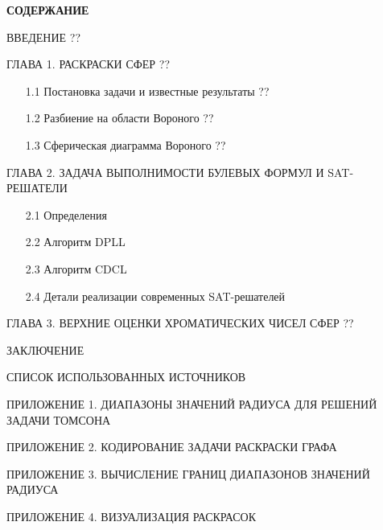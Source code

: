 
\newpage

\thispagestyle{empty} %

\begin{center}
\textbf{СОДЕРЖАНИЕ}
\end{center}
\vspace{1.5mm}

\begin{description}

\item{ВВЕДЕНИЕ} \dotfill ??

\item{ГЛАВА 1.} РАСКРАСКИ СФЕР \dotfill ??
\begin{enumerate}
\item[1.1] Постановка задачи  и известные результаты \dotfill ??
\item[1.2] Разбиение на области Вороного \dotfill ??
\item[1.3] Сферическая диаграмма Вороного \dotfill ??
\end{enumerate}

\item{ГЛАВА 2.} ЗАДАЧА ВЫПОЛНИМОСТИ БУЛЕВЫХ ФОРМУЛ И SAT-РЕШАТЕЛИ \dotfill \pageref{chapters:2}
\begin{enumerate}
\item[2.1] Определения \dotfill \pageref{chapters:2.1}
\item[2.2] Алгоритм DPLL \dotfill \pageref{chapters:2.2}
\item[2.3] Алгоритм CDCL \dotfill \pageref{chapters:2.3}
\item[2.4] Детали реализации современных SAT-решателей \dotfill \pageref{chapters:2.4}
\end{enumerate}


\item{ГЛАВА 3.} ВЕРХНИЕ ОЦЕНКИ ХРОМАТИЧЕСКИХ ЧИСЕЛ СФЕР 
\dotfill ??


\item{ЗАКЛЮЧЕНИЕ} \dotfill \pageref{chapters:conclusions}
\item{СПИСОК ИСПОЛЬЗОВАННЫХ ИСТОЧНИКОВ} \dotfill \pageref{chapters:biblio}

\item{ПРИЛОЖЕНИЕ 1. ДИАПАЗОНЫ ЗНАЧЕНИЙ РАДИУСА ДЛЯ РЕШЕНИЙ ЗАДАЧИ ТОМСОНА} \dotfill \pageref{attachments:1}
\item{ПРИЛОЖЕНИЕ 2. КОДИРОВАНИЕ ЗАДАЧИ РАСКРАСКИ ГРАФА} \dotfill \pageref{attachments:2}
\item{ПРИЛОЖЕНИЕ 3. ВЫЧИСЛЕНИЕ ГРАНИЦ ДИАПАЗОНОВ ЗНАЧЕНИЙ РАДИУСА} \dotfill \pageref{attachments:3}
\item{ПРИЛОЖЕНИЕ 4. ВИЗУАЛИЗАЦИЯ РАСКРАСОК} \dotfill \pageref{attachments:4}


\end{description}
